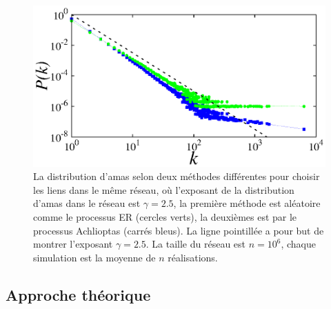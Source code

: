  \begin{figure}[h!]
 	\centering
 	\includegraphics[scale=1.2]{./figures/fig-gama}
 	\caption{La distribution d'amas selon deux méthodes différentes pour choisir les liens dans le même réseau, où l'exposant de la distribution d'amas dans le réseau est $\gamma=2.5$, la première méthode est aléatoire comme le processus ER (cercles verts), la deuxièmes est par le processus Achlioptas \cite{Achlioptas-al2009} (carrés bleus). La ligne pointillée a pour but de montrer  l'exposant  $\gamma=2.5$. La taille du réseau est $n=10^6$, chaque simulation est la moyenne de $n$ réalisations. }
 	\label{gama-5}
 \end{figure}
 
\subsection{Approche théorique}
